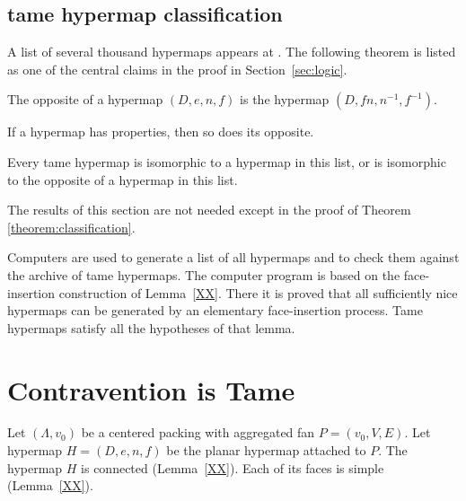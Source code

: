 \subsection{tame hypermap classification}
    \label{sec:proof-classification}

\label{sec:classification}

A list of several thousand hypermaps appears at \cite{web}. The
following theorem is listed as one of the central claims in the
proof in Section~\ref{sec:logic}.

\begin{definition}[opposite] The opposite of a hypermap $(D,e,n,f)$ is the
hypermap $(D,f n,n^{-1},f^{-1})$.
\end{definition}

\begin{lemma} If a hypermap has properties, 
then so does its opposite.
\end{lemma}

\begin{theorem}
\label{theorem:classification} Every tame hypermap is isomorphic to
a hypermap in this list, or is isomorphic to the opposite of a
hypermap in this list.
\end{theorem}

The results of this section are not needed except in the proof of
Theorem \ref{theorem:classification}.

\smallskip

Computers are used to generate a list of all hypermaps and to check
them against the archive of tame hypermaps.  The computer program is
based on the face-insertion construction of Lemma~\ref{XX}.  There it is
proved that all sufficiently nice hypermaps can be generated by an
elementary face-insertion process.  Tame hypermaps satisfy all the
hypotheses of that lemma.





\section{Contravention is Tame}
    \label{sec:contraproof}

Let $(\Lambda,v_0)$ be a centered packing with
aggregated fan $P=(v_0,V,E)$.  Let  hypermap $H=(D,e,n,f)$
be the planar hypermap attached to $P$.
The hypermap $H$ is connected (Lemma~\ref{XX}).  Each of its
faces is simple (Lemma~\ref{XX}).


